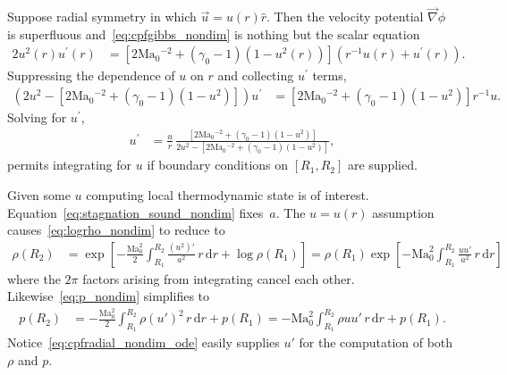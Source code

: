 \documentclass[letterpaper,11pt,nointlimits,reqno]{amsart}
\newcommand{\Mach}[1][]{\mbox{Ma}_{#1}}
\begin{document}
Suppose radial symmetry in which $\vec{u}={u}\!\left(r\right)\hat{r}$.  Then
the velocity potential $\vec{\nabla}\phi$ is superfluous
and~\eqref{eq:cpfgibbs_nondim} is nothing but the scalar equation
\begin{align}
       2 u^2\!\left(r\right) u^\prime\!\left(r\right)
    &=
       \left[
          2 \Mach[0]{}^{-2}
        + \left(\gamma_0-1\right) \left(1 - u^2\!\left(r\right)\right)
       \right]
       \left(
          r^{-1} u\!\left(r\right) + u^\prime\!\left(r\right)
       \right)
.
\end{align}
Suppressing the dependence of $u$ on $r$ and collecting $u^\prime$ terms,
\begin{align}
       \left(
           2 u^2
         - \left[
              2 \Mach[0]{}^{-2} + \left(\gamma_0-1\right) \left(1 - u^2\right)
           \right]
       \right)
       u^\prime
    &=
       \left[
          2 \Mach[0]{}^{-2} + \left(\gamma_0-1\right) \left(1 - u^2\right)
       \right]
       r^{-1} u
.
\end{align}
Solving for $u^\prime$,
\begin{align}
       u^\prime
    &=
       \frac{u}{r}
       \,
       \frac{
         \left[
            2 \Mach[0]{}^{-2} + \left(\gamma_0-1\right) \left(1 - u^2\right)
         \right]
       }{
           2 u^2
         - \left[
              2 \Mach[0]{}^{-2} + \left(\gamma_0-1\right) \left(1 - u^2\right)
           \right]
       }
\label{eq:cpfradial_nondim_ode}
,
\end{align}
permits integrating for $u$ if boundary conditions on $\left[R_1, R_2\right]$
are supplied.

Given some $u$ computing local thermodynamic state is of interest.
Equation~\eqref{eq:stagnation_sound_nondim} fixes~$a$.  The
$u=u\!\left(r\right)$ assumption causes~\eqref{eq:logrho_nondim} to reduce to
\begin{align}
  \rho\!\left(R_2\right)
  &=
  \exp\left[
    - \frac{\Mach[0]^2}{2} \int_{R_1}^{R_2}
        \frac{\left(u^2\right)'}{a^2}
      \, r \, \mathrm{d}r
    + \log\rho\!\left(R_1\right)
  \right]
   =
  \rho\!\left(R_1\right) \exp\left[
    - \Mach[0]^2 \int_{R_1}^{R_2}
        \frac{u u'}{a^2}
      \, r \, \mathrm{d}r
  \right]
\label{eq:cpfradial_nondim_rho}
\end{align}
where the $2\pi$ factors arising from integrating cancel each other.
Likewise~\eqref{eq:p_nondim} simplifies to
\begin{align}
  p\!\left(R_2\right)
  &=
    - \frac{\Mach[0]^2}{2} \int_{R_1}^{R_2}
        \rho \left(u'\right)^2
      \, r \, \mathrm{d}r
    + p\!\left(R_1\right)
   =
    -\Mach[0]^2 \int_{R_1}^{R_2} \rho u u' \, r \, \mathrm{d}r
      + p\!\left(R_1\right)
\label{eq:cpfradial_nondim_p}
.
\end{align}
Notice~\eqref{eq:cpfradial_nondim_ode} easily supplies $u'$ for the computation
of both $\rho$ and $p$.
\end{document}
